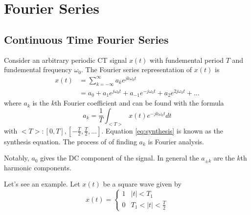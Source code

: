 \section{Fourier Series}

\subsection{Continuous Time Fourier Series}

Consider an arbitrary periodic CT signal $x(t)$ with fundemental
period $T$ and fundemental frequency $\omega_0$. The Fourier series
representation of $x(t)$ is
\begin{align}\label{eq:synthesis}
    x(t) & = \sum_{k=-\infty}^{\infty} a_k e^{jk\omega_0 t}                                  \\
         & = a_0 + a_1e^{j\omega_0 t} + a_{-1}e^{-j\omega_0 t} + a_2e^{2j\omega_0 t} + \dots
\end{align}
where $a_k$ is the $k$th Fourier coefficient and can be found with the formula
\begin{equation}
    a_k = \frac{1}{T} \int_{<T>} x(t) e^{-jk\omega_0 t} dt
\end{equation}
with $<T>: [0, T], [-\frac{T}{2}, \frac{T}{2}, ...]$.
Equation \ref{eq:synthesis} is known as the synthesis equation. The process of
of finding $a_k$ is Fourier analysis.

Notably, $a_0$ gives the DC component of the signal. In general the $a_{\pm k}$
are the $k$th harmonic components.

Let's see an example. Let $x(t)$ be a square wave given by
\begin{equation}
    x(t) = \begin{cases}
        1 & |t| < T_1               \\
        0 & T_1 < |t| < \frac{T}{2}
    \end{cases}
\end{equation}

